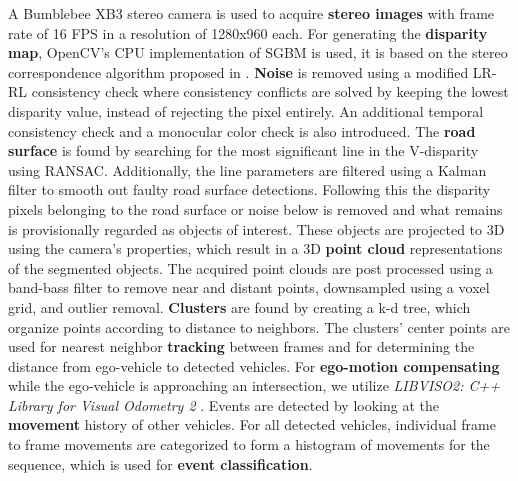 \vspace*{-1.5mm}
\begin{multicols}{2}   
A Bumblebee XB3 stereo camera is used to acquire \textbf{stereo images} with frame rate of 16 FPS in a resolution of 1280x960 each. For generating the \textbf{disparity map}, OpenCV's CPU implementation of  SGBM is used, it is based on the stereo correspondence algorithm proposed in \cite{HirschmullerRLandSGBM}. \textbf{Noise} is removed using a modified LR-RL consistency check where consistency conflicts are solved by keeping the lowest disparity value, instead of rejecting the pixel entirely. An additional temporal consistency check and a monocular color check is also introduced.
The \textbf{road surface} is found by searching for the most significant line in the V-disparity \cite{labayrade2002real} using RANSAC. Additionally, the line parameters are filtered using a Kalman filter to smooth out faulty road surface detections. Following this the disparity pixels belonging to the road surface or noise below is removed and what remains is provisionally regarded as objects of interest. These objects are projected to 3D using the camera's properties, which result in a 3D \textbf{point cloud} representations of the segmented objects.
The acquired point clouds are post processed using a band-bass filter to remove near and distant points, downsampled using a voxel grid, and outlier removal. \textbf{Clusters} are found by creating a k-d tree, which organize points according to distance to neighbors. The clusters' center points are used for nearest neighbor \textbf{tracking} between frames and for determining the distance from ego-vehicle to detected vehicles.
For \textbf{ego-motion compensating} while the ego-vehicle is approaching an intersection, we utilize \textit{LIBVISO2: C++ Library for Visual Odometry 2} \cite{Geiger2011IV}. 
Events are detected by looking at the \textbf{movement} history of other vehicles. For all detected vehicles, individual frame to frame movements are categorized to form a histogram of movements for the sequence, which is used for \textbf{event classification}.

\end{multicols}

